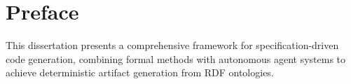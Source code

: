 \documentclass[12pt,letterpaper,oneside]{report}
\theoremstyle{definition}
\theoremstyle{remark}
\begin{document}


\tableofcontents

\listoffigures

\listoftables

\listofalgorithms

\chapter*{Preface}

This dissertation presents a comprehensive framework for specification-driven code generation, combining formal methods with autonomous agent systems to achieve deterministic artifact generation from RDF ontologies.













\appendix











\end{document}
